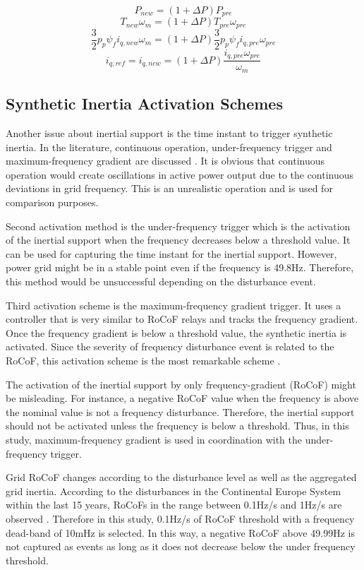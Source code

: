 \begin{equation}
P_{new}=(1+\Delta P) P_{pre}
\label{inertialsupport1}
\end{equation}
\begin{equation}
T_{new} \omega_{m}=(1+\Delta P) T_{pre} \omega_{pre}
\label{inertialsupport2}
\end{equation}
\begin{equation}
\frac{3}{2} p_{p} \psi_{f} i_{q,new} \omega_{m}=(1+\Delta P) \frac{3}{2} p_{p} \psi_{f} i_{q,pre} \omega_{pre}
\label{inertialsupport3}
\end{equation}
\begin{equation}
 i_{q,ref}=i_{q,new}=(1+\Delta P) \frac{i_{q,pre} \omega_{pre}}{ \omega_{m}} 
\label{inertialsupport4}
\end{equation}
\subsection{Synthetic Inertia Activation Schemes}
Another issue about inertial support is the time instant to trigger synthetic inertia. In the literature, continuous operation, under-frequency trigger and maximum-frequency gradient are discussed \cite{Gonzalez-longatt2015}. It is obvious that continuous operation would create oscillations in active power output due to the continuous deviations in grid frequency. This is an unrealistic operation and is used for comparison purposes.\par
Second activation method is the under-frequency trigger which is the activation of the inertial support when the frequency decreases below a threshold value. It can be used for capturing the time instant for the inertial support. However, power grid might be in a stable point even if the frequency is 49.8Hz. Therefore, this method would be unsuccessful depending on the disturbance event. \par 
Third activation scheme is the maximum-frequency gradient trigger. It uses a controller that is very similar to RoCoF relays and tracks the frequency gradient. Once the frequency gradient is below a threshold value, the synthetic inertia is activated. Since the severity of frequency disturbance event is related to the RoCoF, this activation scheme is the most remarkable scheme \cite{Gonzalez-longatt2015}. \par 
The activation of the inertial support by only frequency-gradient (RoCoF) might be misleading. For instance, a negative RoCoF value when the frequency is above the nominal value is not a frequency disturbance. Therefore, the inertial support should not be activated unless the frequency is below a threshold. Thus, in this study, maximum-frequency gradient is used in coordination with the under-frequency trigger. \par 
Grid RoCoF changes according to the disturbance level as well as the aggregated grid inertia. According to the disturbances in the Continental Europe System within the last 15 years, RoCoFs in the range between 0.1Hz/s and 1Hz/s are observed \cite{ENTSO-E2016}. Therefore in this study, 0.1Hz/s of RoCoF threshold with a frequency dead-band of 10mHz is selected. In this way, a negative RoCoF above 49.99Hz is not captured as events as long as it does not decrease below the under frequency threshold.

